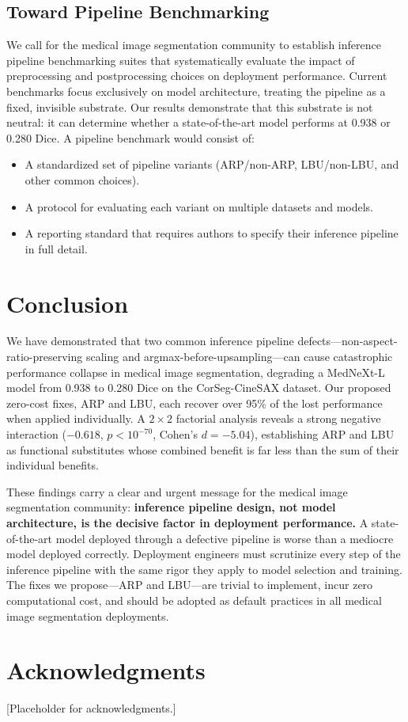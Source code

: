 \documentclass[10pt,twocolumn]{article}
\begin{document}
\subsection{Toward Pipeline Benchmarking}

We call for the medical image segmentation community to establish inference pipeline benchmarking suites that systematically evaluate the impact of preprocessing and postprocessing choices on deployment performance.
Current benchmarks focus exclusively on model architecture, treating the pipeline as a fixed, invisible substrate.
Our results demonstrate that this substrate is not neutral: it can determine whether a state-of-the-art model performs at 0.938 or 0.280 Dice.
A pipeline benchmark would consist of:
\begin{itemize}[leftmargin=*]
    \item A standardized set of pipeline variants (ARP/non-ARP, LBU/non-LBU, and other common choices).
    \item A protocol for evaluating each variant on multiple datasets and models.
    \item A reporting standard that requires authors to specify their inference pipeline in full detail.
\end{itemize}

\section{Conclusion}
\label{sec:conclusion}

We have demonstrated that two common inference pipeline defects---non-aspect-ratio-preserving scaling and argmax-before-upsampling---can cause catastrophic performance collapse in medical image segmentation, degrading a MedNeXt-L model from 0.938 to 0.280 Dice on the CorSeg-CineSAX dataset.
Our proposed zero-cost fixes, ARP and LBU, each recover over 95\% of the lost performance when applied individually.
A $2\times2$ factorial analysis reveals a strong negative interaction ($-0.618$, $p < 10^{-70}$, Cohen's $d = -5.04$), establishing ARP and LBU as functional substitutes whose combined benefit is far less than the sum of their individual benefits.

These findings carry a clear and urgent message for the medical image segmentation community: \textbf{inference pipeline design, not model architecture, is the decisive factor in deployment performance.}
A state-of-the-art model deployed through a defective pipeline is worse than a mediocre model deployed correctly.
Deployment engineers must scrutinize every step of the inference pipeline with the same rigor they apply to model selection and training.
The fixes we propose---ARP and LBU---are trivial to implement, incur zero computational cost, and should be adopted as default practices in all medical image segmentation deployments.

\section*{Acknowledgments}
[Placeholder for acknowledgments.]



\end{document}
